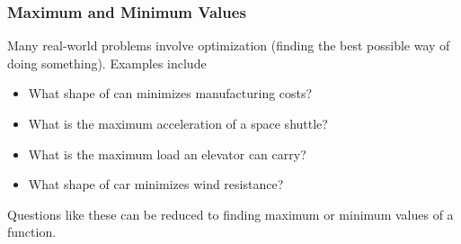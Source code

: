 \begin{frame}
\frametitle{Maximum and Minimum Values}
Many real-world problems involve optimization (finding the best possible way of doing something).  Examples include
\begin{itemize}
\item  What shape of can minimizes manufacturing costs?
\item  What is the maximum acceleration of a space shuttle?
\item  What is the maximum load an elevator can carry?
\item  What shape of car minimizes wind resistance?
\end{itemize}
Questions like these can be reduced to finding maximum or minimum values of a function.
\end{frame}

